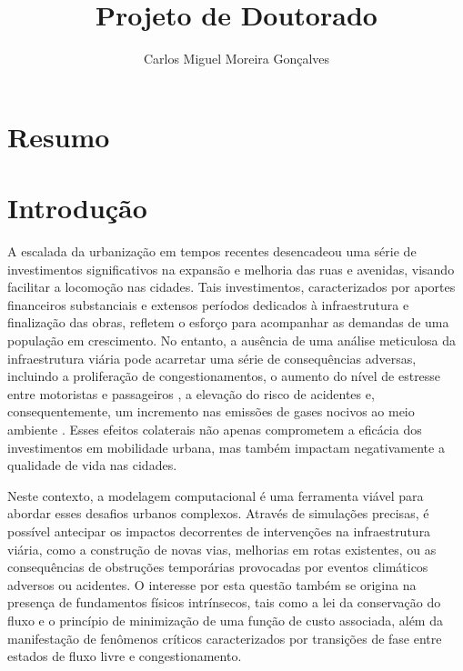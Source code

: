\documentclass{article}
\title{Projeto de Doutorado}
\author{Carlos Miguel Moreira Gonçalves}
\begin{document}
\maketitle

\section{Resumo}

\newpage

\section{Introdução}


A escalada da urbanização \cite{urbanization} em tempos recentes desencadeou uma série de investimentos significativos na expansão e melhoria das ruas e avenidas, visando facilitar a locomoção nas cidades. Tais investimentos, caracterizados por aportes financeiros substanciais e extensos períodos dedicados à infraestrutura e finalização das obras, refletem o esforço para acompanhar as demandas de uma população em crescimento. No entanto, a ausência de uma análise meticulosa da infraestrutura viária pode acarretar uma série de consequências adversas, incluindo a proliferação de congestionamentos, o aumento do nível de estresse entre motoristas e passageiros \cite{Hegewald2020}, a elevação do risco de acidentes e, consequentemente, um incremento nas emissões de gases nocivos ao meio ambiente \citep{Wang2018}. Esses efeitos colaterais não apenas comprometem a eficácia dos investimentos em mobilidade urbana, mas também impactam negativamente a qualidade de vida nas cidades.


Neste contexto, a modelagem computacional é uma ferramenta viável para abordar esses desafios urbanos complexos. Através de simulações precisas, é possível antecipar os impactos decorrentes de intervenções na infraestrutura viária, como a construção de novas vias, melhorias em rotas existentes, ou as consequências de obstruções temporárias provocadas por eventos climáticos adversos ou acidentes. O interesse por esta questão também se origina na presença de fundamentos físicos intrínsecos, tais como a lei da conservação do fluxo e o princípio de minimização de uma função de custo associada, além da manifestação de fenômenos críticos caracterizados por transições de fase entre estados de fluxo livre e congestionamento. 
\end{document}
